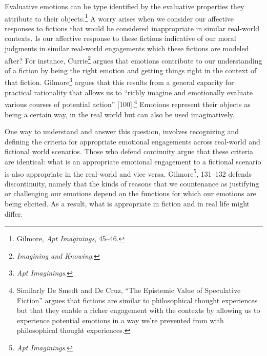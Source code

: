 \documentclass[
  12pt,
]{book}
\theoremstyle{definition}
\theoremstyle{definition}
\theoremstyle{definition}
\theoremstyle{definition}
\theoremstyle{remark}
\begin{document}
Evaluative emotions can be type identified by the evaluative properties they attribute to their objects.\footnote{Gilmore, \emph{Apt {Imaginings}}, 45--46.} A worry arises when we consider our affective responses to fictions that would be considered inappropriate in similar real-world contexts. Is our affective response to these fictions indicative of our moral judgments in similar real-world engagements which these fictions are modeled after? For instance, Currie\footnote{\emph{Imagining and Knowing}.} argues that emotions contribute to our understanding of a fiction by being the right emotion and getting things right in the context of that fiction. Gilmore\footnote{\emph{Apt {Imaginings}}.} argues that this results from a general capacity for practical rationality that allows us to ``richly imagine and emotionally evaluate various courses of potential action'' {[}100{]}.\footnote{Similarly De Smedt and De Cruz, {``The Epistemic Value of Speculative Fiction''} argues that fictions are similar to philosophical thought experiences but that they enable a richer engagement with the contexts by allowing us to experience potential emotions in a way we're prevented from with philosophical thought experiences.} Emotions represent their objects as being a certain way, in the real world but can also be used imaginatively.

One way to understand and answer this question, involves recognizing and defining the criteria for appropriate emotional engagements across real-world and fictional world scenarios. Those who defend continuity argue that these criteria are identical: what is an appropriate emotional engagement to a fictional scenario is also appropriate in the real-world and vice versa. Gilmore\footnote{\emph{Apt {Imaginings}}.}, 131--132 defends discontinuity, namely that the kinds of reasons that we countenance as justifying or challenging our emotions depend on the functions for which our emotions are being elicited. As a result, what is appropriate in fiction and in real life might differ.
\end{document}
